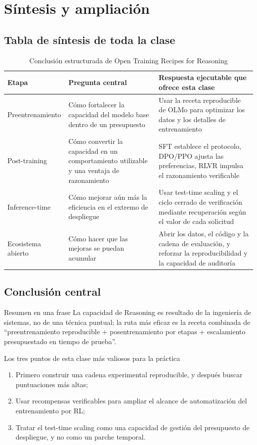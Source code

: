 \section{Síntesis y ampliación}

\subsection{Tabla de síntesis de toda la clase}
\begin{table}[H]
\centering
\renewcommand{\arraystretch}{1.2}
\begin{tabular}{p{2.7cm}p{3.9cm}p{4.2cm}}
\toprule
\textbf{Etapa} & \textbf{Pregunta central} & \textbf{Respuesta ejecutable que ofrece esta clase} \\
\midrule
Preentrenamiento & Cómo fortalecer la capacidad del modelo base dentro de un presupuesto & Usar la receta reproducible de OLMo para optimizar los datos y los detalles de entrenamiento \\
Post-training & Cómo convertir la capacidad en un comportamiento utilizable y una ventaja de razonamiento & SFT establece el protocolo, DPO/PPO ajusta las preferencias, RLVR impulsa el razonamiento verificable \\
Inference-time & Cómo mejorar aún más la eficiencia en el extremo de despliegue & Usar test-time scaling y el ciclo cerrado de verificación mediante recuperación según el valor de cada solicitud \\
Ecosistema abierto & Cómo hacer que las mejoras se puedan acumular & Abrir los datos, el código y la cadena de evaluación, y reforzar la reproducibilidad y la capacidad de auditoría \\
\bottomrule
\end{tabular}
\caption{Conclusión estructurada de Open Training Recipes for Reasoning}
\end{table}

\subsection{Conclusión central}
\begin{importantbox}{Resumen en una frase}
La capacidad de Reasoning es resultado de la ingeniería de sistemas, no de una técnica puntual; la ruta más eficaz es la receta combinada de ``preentrenamiento reproducible + posentrenamiento por etapas + escalamiento presupuestado en tiempo de prueba''.
\end{importantbox}

\begin{knowledgebox}{Los tres puntos de esta clase más valiosos para la práctica}
\begin{enumerate}
    \item Primero construir una cadena experimental reproducible, y después buscar puntuaciones más altas;
    \item Usar recompensas verificables para ampliar el alcance de automatización del entrenamiento por RL;
    \item Tratar el test-time scaling como una capacidad de gestión del presupuesto de despliegue, y no como un parche temporal.
\end{enumerate}
\end{knowledgebox}

